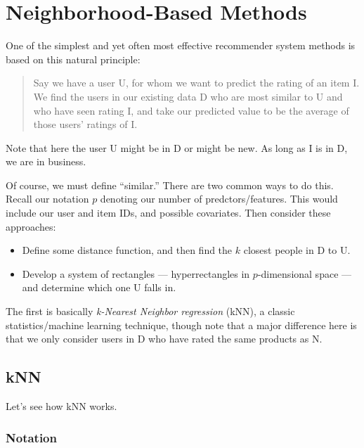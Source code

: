 \chapter{Neighborhood-Based Methods}  
\label{chap:knn}  

One of the simplest and yet often most effective recommender system
methods is based on this natural principle: 

\begin{quote}

Say we have a user U, for whom we want to predict the rating of an item I.
We find the users in our existing data D who are most similar to U and who
have seen rating I, and take our predicted value to be the average of
those users' ratings of I. 

\end{quote}

Note that here the user U might be in D or might be new.  As long as I
is in D, we are in business.

Of course, we must define ``similar.''  There are two common ways to do
this.  Recall our notation $p$ denoting our number of
predctors/features.  This would include our user and item IDs, and
possible covariates.  Then consider these approaches:

\begin{itemize}

\item Define some distance function, and then find the $k$ closest
people in D to U.  

\item Develop a system of rectangles --- hyperrectangles in
$p$-dimensional space --- and determine which one U falls in.  

\end{itemize} 

The first is basically \textit{k-Nearest Neighbor regression} (kNN), a
classic statistics/machine learning technique, though note that a major
difference here is that we only consider users in D who have rated the
same products as N.  

\section{kNN}

Let's see how kNN works.

\subsection{Notation}

